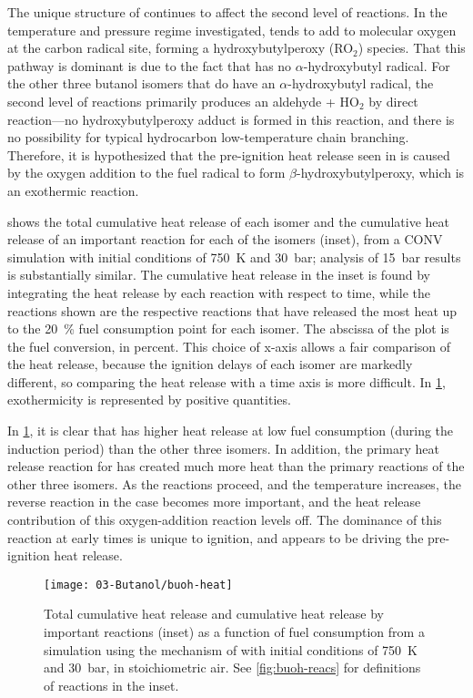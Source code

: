 \documentclass[../main.tex]{subfiles}
\begin{document}
The unique structure of \tBuOH{} continues to affect the second level
of reactions. In the temperature and pressure regime investigated,
\tBuOH{} tends to add to molecular oxygen at the carbon radical site,
forming a hydroxybutylperoxy (RO$_2$) species. That this pathway is dominant is
due to the fact that \tBuOH{} has no $\alpha$-hydroxybutyl radical.
For the other three butanol isomers that do have an $\alpha$-hydroxybutyl
radical, the second level of reactions primarily produces an aldehyde + HO$_2$
by direct reaction–--no hydroxybutylperoxy adduct is formed in this reaction,
and there is no possibility for typical hydrocarbon low-temperature chain
branching. Therefore, it is hypothesized that the pre-ignition heat release
seen in \tBuOH{} is caused by the oxygen addition to the fuel radical
to form $\beta$-hydroxybutylperoxy, which is an exothermic reaction.

 shows the total cumulative heat release of each isomer
and the cumulative heat release of an important reaction for each of the
isomers (inset), from a CONV simulation with initial conditions of \SI{750}{\kelvin} and
\SI{30}{\bar}; analysis of \SI{15}{\bar} results is substantially similar. The cumulative heat
release in the inset is found by integrating the heat release by each reaction
with respect to time, while the reactions shown are the respective reactions
that have released the most heat up to the \SI{20}{\percent} fuel consumption point for each
isomer. The abscissa of the plot is the fuel conversion, in percent. This
choice of x-axis allows a fair comparison of the heat release, because the
ignition delays of each isomer are markedly different, so comparing the heat
release with a time axis is more difficult. In \cref{fig:buoh-heat},
exothermicity is represented by positive quantities.

In \cref{fig:buoh-heat}, it is clear that \tBuOH{} has higher
heat release at low fuel consumption (during the induction period) than the
other three isomers. In addition, the primary heat release reaction for
\tBuOH{} has created much more heat than the primary reactions of the
other three isomers. As the reactions proceed, and the temperature increases,
the reverse reaction in the \tBuOH{} case becomes more important, and
the heat release contribution of this oxygen-addition reaction levels off. The
dominance of this reaction at early times is unique to \tBuOH{}
ignition, and appears to be driving the pre-ignition heat release.

\begin{figure}
    \texttt{[image: 03-Butanol/buoh-heat]}
    \caption{Total cumulative heat release and cumulative heat release by
        important reactions (inset) as a function of fuel consumption from a
        simulation using the mechanism of \textcite{Sarathy2012} with initial
        conditions of \SI{750}{\kelvin} and \SI{30}{\bar}, in stoichiometric air. See
        \cref{fig:buoh-reacs} for definitions of reactions in the inset.}
    \label{fig:buoh-heat}
\end{figure}
\end{document}
